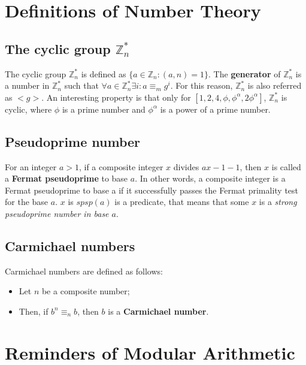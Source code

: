\section{Definitions of Number Theory}
\subsection{The cyclic group $\mathbb{Z}_{n}^{*}$}
The cyclic group $\mathbb{Z}_{n}^{*}$ is defined as $\{a \in \mathbb{Z}_{n}: (a,n) = 1\}$.\newline
The \textbf{generator} of $\mathbb{Z}_{n}^{*}$ is a number in $\mathbb{Z}_{n}^{*}$ such that
$\forall a \in \mathbb{Z}_{n}^{*} \exists i: a \equiv_{m} g^{i}$.
For this reason, $\mathbb{Z}_{n}^{*}$ is also referred as $< g >$.\newline
An interesting property is that only for $[1,2,4, \phi, \phi^{\alpha}, 2 \phi^{\alpha}]$,
 $\mathbb{Z}_{n}^{*}$ is cyclic, where $\phi$ is a prime number and $\phi^\alpha$ is a power of a prime number.\newline


\subsection{Pseudoprime number}
For an integer $a > 1$, if a composite integer $x$ divides $ax-1 - 1$, then $x$ is called a \textbf{Fermat pseudoprime} to base $a$.\newline
In other words, a composite integer is a Fermat pseudoprime to base a if it successfully passes the Fermat primality test for the base $a$.\newline
 $x$ is $spsp(a)$ is a predicate, that means that some $x$ is a \emph{strong pseudoprime number in base $a$}.

\subsection{Carmichael numbers}
Carmichael numbers are defined as follows:
\begin{itemize}
    \item Let $n$ be a composite number;
    \item Then, if $b^{n} \equiv_{n} b$, then $b$ is a \textbf{Carmichael number}.
\end{itemize}

\section{Reminders of Modular Arithmetic}
